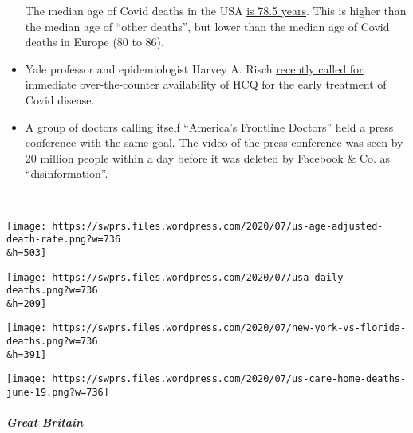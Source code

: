 \begin{itemize}
  The median age of Covid deaths in the USA
  \href{https://twitter.com/kylamb8/status/1287952340822175744}{is 78.5
  years}. This is higher than the median age of ``other deaths'', but
  lower than the median age of Covid deaths in Europe (80 to 86).
\item
  Yale professor and epidemiologist Harvey A. Risch
  \href{https://www.newsweek.com/key-defeating-covid-19-already-exists-we-need-start-using-it-opinion-1519535}{recently
  called for} immediate over-the-counter availability of HCQ for the
  early treatment of Covid disease.
\item
  A group of doctors calling itself ``America's Frontline Doctors'' held
  a press conference with the same goal. The
  \href{https://omnij.org/AmericasFrontlineDoctors}{video of the press
  conference} was seen by 20 million people within a day before it was
  deleted by Facebook \& Co. as ``disinformation''.
\end{itemize}

~

\texttt{[image: https://swprs.files.wordpress.com/2020/07/us-age-adjusted-death-rate.png?w=736\\\&h=503]}

\texttt{[image: https://swprs.files.wordpress.com/2020/07/usa-daily-deaths.png?w=736\\\&h=209]}

\texttt{[image: https://swprs.files.wordpress.com/2020/07/new-york-vs-florida-deaths.png?w=736\\\&h=391]}

\texttt{[image: https://swprs.files.wordpress.com/2020/07/us-care-home-deaths-june-19.png?w=736]}

\hypertarget{great-britain}{%
\subparagraph{\texorpdfstring{\textbf{Great
Britain}}{Great Britain}}\label{great-britain}}

